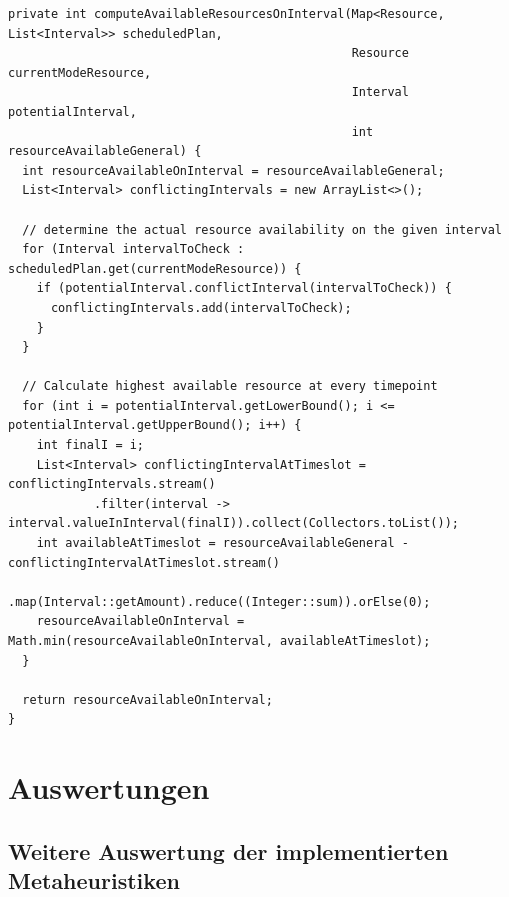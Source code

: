 \begin{lstlisting}[caption={Algorithmus zur Berechnung von vorhandenen Ressourcen einer Ressourcenart für potentielles Intervall},label=lst:scheduler_computeAvailableResourcesOnInterval, mathescape=truexinputencoding={utf8}, extendedchars=false, escapeinside=``, basicstyle=\scriptsize]
private int computeAvailableResourcesOnInterval(Map<Resource, List<Interval>> scheduledPlan,
                                                Resource currentModeResource,
                                                Interval potentialInterval,
                                                int resourceAvailableGeneral) {
  int resourceAvailableOnInterval = resourceAvailableGeneral;
  List<Interval> conflictingIntervals = new ArrayList<>();

  // determine the actual resource availability on the given interval
  for (Interval intervalToCheck : scheduledPlan.get(currentModeResource)) {
    if (potentialInterval.conflictInterval(intervalToCheck)) {
      conflictingIntervals.add(intervalToCheck);
    }
  }

  // Calculate highest available resource at every timepoint
  for (int i = potentialInterval.getLowerBound(); i <= potentialInterval.getUpperBound(); i++) {
    int finalI = i;
    List<Interval> conflictingIntervalAtTimeslot = conflictingIntervals.stream()
            .filter(interval -> interval.valueInInterval(finalI)).collect(Collectors.toList());
    int availableAtTimeslot = resourceAvailableGeneral - conflictingIntervalAtTimeslot.stream()
            .map(Interval::getAmount).reduce((Integer::sum)).orElse(0);
    resourceAvailableOnInterval = Math.min(resourceAvailableOnInterval, availableAtTimeslot);
  }

  return resourceAvailableOnInterval;
}
\end{lstlisting}

\chapter{Auswertungen}
\label{ch:Auswertungen}

\section{Weitere Auswertung der implementierten Metaheuristiken}
\label{sec:WeitereAuswertung_Metaheuristiken}


